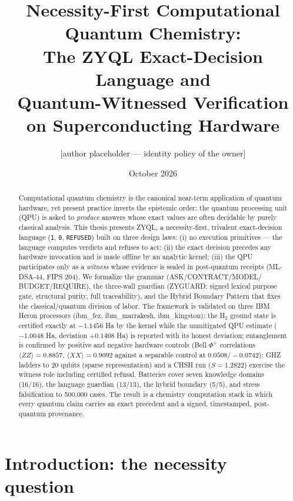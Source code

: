 \documentclass[11pt,a4paper]{report}
\title{\textbf{Necessity-First Computational Quantum Chemistry:\\
The ZYQL Exact-Decision Language and\\
Quantum-Witnessed Verification on Superconducting Hardware}}
\author{[author placeholder --- identity policy of the owner]}
\date{October 2026}
\begin{document}
\maketitle

\begin{abstract}
\noindent
Computational quantum chemistry is the canonical near-term application of
quantum hardware, yet present practice inverts the epistemic order: the
quantum processing unit (QPU) is asked to \emph{produce} answers whose exact
values are often decidable by purely classical analysis. This thesis presents
ZYQL, a necessity-first, trivalent exact-decision language (\texttt{1},
\texttt{0}, \texttt{REFUSED}) built on three design laws: (i) no execution
primitives --- the language computes verdicts and refuses to act;
(ii) the exact decision precedes any hardware invocation and is made
offline by an analytic kernel; (iii) the QPU participates only as a
\emph{witness} whose evidence is sealed in post-quantum receipts
(ML-DSA-44, FIPS 204). We formalize the grammar (ASK/CONTRACT/MODEL/
BUDGET/REQUIRE), the three-wall guardian (ZYGUARD: signed lexical purpose
gate, structural purity, full traceability), and the Hybrid Boundary
Pattern that fixes the classical/quantum division of labor. The framework
is validated on three IBM Heron processors (ibm\_fez, ibm\_marrakesh,
ibm\_kingston): the H$_2$ ground state is certified exactly at
$-1.1456$ Ha by the kernel while the unmitigated QPU estimate
($-1.0048$ Ha, deviation $+0.1408$ Ha) is reported with its honest
deviation; entanglement is confirmed by positive and negative hardware
controls (Bell $\Phi^+$ correlations $\langle ZZ\rangle=0.8857$,
$\langle XX\rangle=0.9092$ against a separable control at
$0.0508/-0.0742$); GHZ ladders to 20 qubits (sparse representation)
and a CHSH run ($S=1.2822$) exercise the witness role including
certified refusal. Batteries cover seven knowledge domains (16/16),
the language guardian (13/13), the hybrid boundary (5/5), and stress
falsification to 500{,}000 cases. The result is a chemistry computation
stack in which every quantum claim carries an exact precedent and a
signed, timestamped, post-quantum provenance.
\end{abstract}

\tableofcontents

\chapter{Introduction: the necessity question}
\label{ch:intro}
\end{document}
